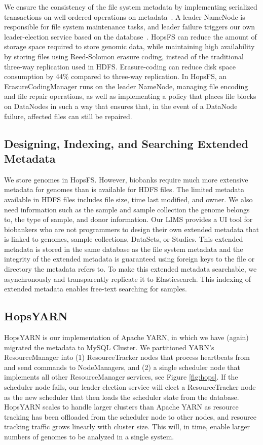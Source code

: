 We ensure the consistency of the file system metadata by implementing serialized transactions on well-ordered operations on metadata~\cite{hops_consistency}. A leader NameNode is responsible for file system maintenance tasks,  and leader failure triggers our own leader-election service based on the database~\cite{hopselection}. 
HopsFS can reduce the amount of storage space required to store genomic data, while maintaining high availability by storing files using Reed-Solomon erasure coding, instead of the traditional three-way replication  used in HDFS. Erasure-coding can reduce disk space consumption by 44\% compared to three-way replication. In HopsFS, an ErasureCodingManager runs on the  leader NameNode, managing file encoding and file repair operations, as well as implementing a policy that places file blocks on DataNodes in such a way that ensures that, in the event of a DataNode failure, affected files can still be repaired.

\subsection*{Designing, Indexing, and Searching Extended Metadata}
We store genomes in HopsFS. However, biobanks require much more extensive metadata for genomes than is available for HDFS files. The limited metadata available in HDFS files includes file size, time last modified, and owner. We also need information such as the sample and sample collection the genome belongs to, the type of sample, and donor information. Our LIMS provides a UI tool for biobankers who are not programmers to design their own  extended metadata that is linked  to genomes, sample collections, DataSets, or Studies. This extended metadata is stored in the same database as the file system metadata and the integrity of the extended metadata is guaranteed using foreign keys to the file or directory the metadata refers to.
To make this extended metadata searchable, we asynchronously and transparently replicate it to Elasticsearch. This indexing of extended metadata enables free-text searching for samples.


\subsection*{HopsYARN}
HopsYARN is our implementation of Apache YARN, in which we have (again) migrated the metadata to MySQL Cluster. We partitioned YARN's ResourceManager into (1) ResourceTracker nodes that process heartbeats from and send commands to NodeManagers, and (2) a single scheduler node that implements all other ResourceManager services, see Figure \ref{fig:hops}. If the scheduler node fails, our leader election service will elect a ResourceTracker node as the new scheduler that then loads the scheduler state from the database. HopsYARN scales to handle larger clusters than Apache YARN as resource tracking has been offloaded from the scheduler node to other nodes, and resource tracking traffic grows linearly with cluster size. This will, in time, enable larger numbers of genomes to be analyzed in a single system.

